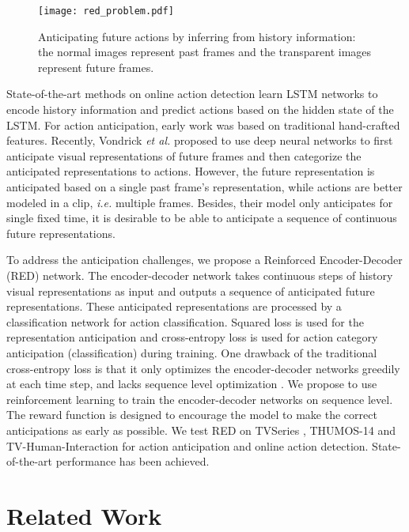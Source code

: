 \documentclass{bmvc2k}
\begin{document}
\begin{figure*}[h]
\centering
\texttt{[image: red\_problem.pdf]}
\caption{Anticipating future actions by inferring from history information: the normal images represent past frames and the transparent images represent future frames. }
\end{figure*}

State-of-the-art methods on online action detection \cite{Ma_2016_CVPR, de2016online, yeung2015every} learn LSTM networks to encode history information and predict actions based on the hidden state of the LSTM. For action anticipation, early work \cite{lan2014hierarchical, pei2011parsing} was based on  traditional hand-crafted features. Recently, Vondrick \emph{et al.} \cite{vondrick2016anticipating} proposed to use deep neural networks to first anticipate visual representations of future frames and then categorize the anticipated representations to actions. However, the future representation is anticipated based on a single past frame's representation, while actions are better modeled in a clip, \emph{i.e.} multiple frames. Besides, their model only anticipates for single fixed time, it is desirable to be able to anticipate a sequence of continuous future representations. 

To address the anticipation challenges, we propose a Reinforced Encoder-Decoder (RED) network. The encoder-decoder network takes continuous steps of history visual representations as input and outputs a sequence of anticipated future representations. These anticipated representations are processed by a classification network for action classification. Squared loss is used for the representation anticipation and cross-entropy loss is used for action category anticipation (classification) during training. One drawback of the traditional cross-entropy loss is that it only optimizes the encoder-decoder networks greedily at each time step, and lacks sequence level optimization \cite{ranzato2015sequence}. We propose to use reinforcement learning to train the encoder-decoder networks on sequence level. The reward function is designed to encourage the model to make the correct anticipations as early as possible. We test RED on TVSeries  \cite{de2016online}, THUMOS-14 and TV-Human-Interaction \cite{patron2010high} for action anticipation and online action detection. State-of-the-art performance has been achieved.



\section{Related Work}
\end{document}
